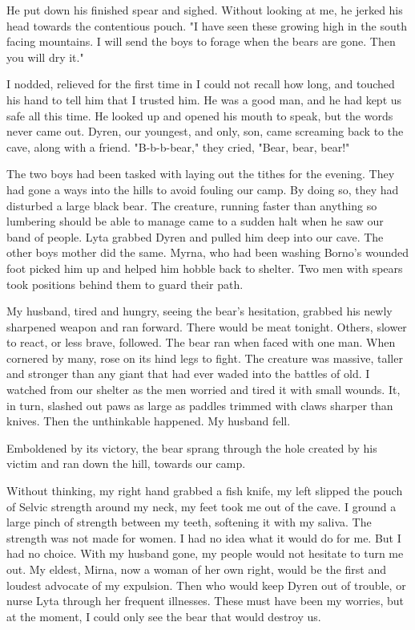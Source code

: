 He put down his finished spear and sighed. Without looking at me, he jerked his head towards the contentious pouch. "I have seen these growing high in the south facing mountains. I will send the boys to forage when the bears are gone. Then you will dry it."

I nodded, relieved for the first time in I could not recall how long, and touched his hand to tell him that I trusted him. He was a good man, and he had kept us safe all this time. He looked up and opened his mouth to speak, but the words never came out. Dyren, our youngest, and only, son, came screaming back to the cave, along with a friend. "B-b-b-bear," they cried, "Bear, bear, bear!"

The two boys had been tasked with laying out the tithes for the evening. They had gone a ways into the hills to avoid fouling our camp. By doing so, they had disturbed a large black bear. The creature, running faster than anything so lumbering should be able to manage came to a sudden halt when he saw our band of people. Lyta grabbed Dyren and pulled him deep into our cave. The other boys mother did the same. Myrna, who had been washing Borno's wounded foot picked him up and helped him hobble back to shelter. Two men with spears took positions behind them to guard their path.

My husband, tired and hungry, seeing the bear's hesitation, grabbed his newly sharpened weapon and ran forward. There would be meat tonight. Others, slower to react, or less brave, followed. The bear ran when faced with one man. When cornered by many, rose on its hind legs to fight. The creature was massive, taller and stronger than any giant that had ever waded into the battles of old. I watched from our shelter as the men worried and tired it with small wounds. It, in turn, slashed out paws as large as paddles trimmed with claws sharper than knives. Then the unthinkable happened. My husband fell.

Emboldened by its victory, the bear sprang through the hole created by his victim and ran down the hill, towards our camp.

Without thinking, my right hand grabbed a fish knife, my left slipped the pouch of Selvic strength around my neck, my feet took me out of the cave. I ground a large pinch of strength between my teeth, softening it with my saliva. The strength was not made for women. I had no idea what it would do for me. But I had no choice. With my husband gone, my people would not hesitate to turn me out. My eldest, Mirna, now a woman of her own right, would be the first and loudest advocate of my expulsion. Then who would keep Dyren out of trouble, or nurse Lyta through her frequent illnesses. These must have been my worries, but at the moment, I could only see the bear that would destroy us.

